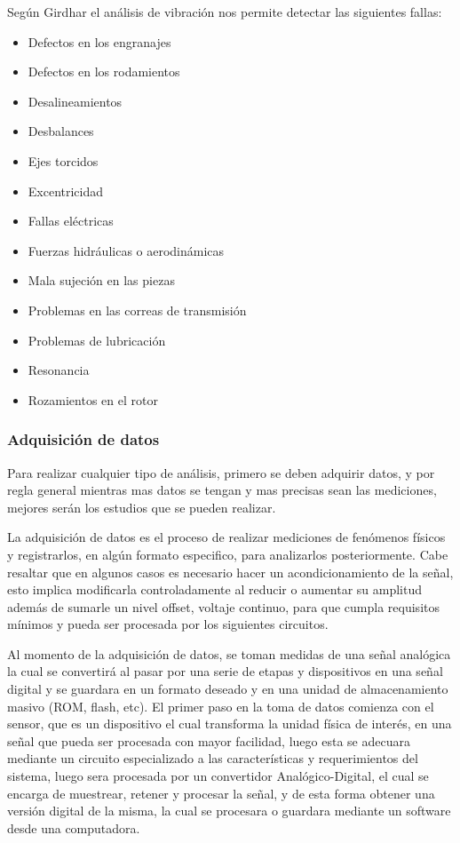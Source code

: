 Según Girdhar \Cite{Girdhar}  el análisis de vibración nos permite detectar las
siguientes fallas:

\begin{itemize}
\item Defectos en los engranajes
\item Defectos en los rodamientos
\item Desalineamientos
\item Desbalances
\item Ejes torcidos
\item Excentricidad
\item Fallas eléctricas
\item Fuerzas hidráulicas o aerodinámicas
\item Mala sujeción en las piezas
\item Problemas en las correas de transmisión
\item Problemas de lubricación
\item Resonancia
\item Rozamientos en el rotor
\end{itemize}


\subsubsection*{Adquisición de datos}

Para realizar cualquier tipo de análisis, primero se deben adquirir datos, y
por regla general mientras mas datos se tengan y mas precisas sean las
mediciones, mejores serán los estudios que se pueden realizar.

La adquisición de datos es el proceso de realizar mediciones de fenómenos físicos
y registrarlos, en algún formato especifico, para analizarlos posteriormente.
Cabe resaltar que en algunos casos es necesario hacer un acondicionamiento de
la señal, esto
implica modificarla controladamente al reducir o aumentar su amplitud además de
sumarle un nivel offset, voltaje continuo, para que cumpla requisitos mínimos
y pueda ser procesada por los siguientes circuitos.

Al momento de la adquisición de datos, se toman medidas de una señal analógica
la cual se convertirá al pasar por una serie de etapas y dispositivos en una
señal digital y se guardara en un formato deseado y en una unidad de
almacenamiento masivo (ROM, flash, etc).
El primer paso en la toma de  datos comienza con el sensor, que es un
dispositivo el cual transforma la unidad física de interés, en una señal que
pueda ser procesada con mayor facilidad, luego esta se adecuara mediante un
circuito especializado a las características y requerimientos del sistema,
luego sera procesada por un convertidor Analógico-Digital, el cual se encarga de
muestrear, retener y procesar la señal, y de esta forma obtener una versión
digital de la misma, la cual se procesara o guardara mediante un software desde
una computadora.

